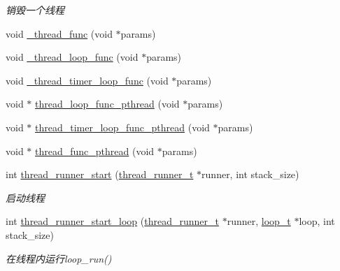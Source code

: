\begin{DoxyCompactItemize}
\begin{DoxyCompactList}\small\item\em 销毁一个线程 \end{DoxyCompactList}\item 
void \hyperlink{a00081_ae1217c770962ea59a20fa931ad6fee0c_ae1217c770962ea59a20fa931ad6fee0c}{\+\_\+thread\+\_\+func} (void $\ast$params)
\item 
void \hyperlink{a00081_ad2578ccaa4c6ce7670eabd9575204c38_ad2578ccaa4c6ce7670eabd9575204c38}{\+\_\+thread\+\_\+loop\+\_\+func} (void $\ast$params)
\item 
void \hyperlink{a00081_af3540c31c89a280433080939f96da861_af3540c31c89a280433080939f96da861}{\+\_\+thread\+\_\+timer\+\_\+loop\+\_\+func} (void $\ast$params)
\item 
void $\ast$ \hyperlink{a00081_a4f94afc82ab1358bdfdaa1739ca71655_a4f94afc82ab1358bdfdaa1739ca71655}{thread\+\_\+loop\+\_\+func\+\_\+pthread} (void $\ast$params)
\item 
void $\ast$ \hyperlink{a00081_a878593e36d665dc3334cf71e88bf93e6_a878593e36d665dc3334cf71e88bf93e6}{thread\+\_\+timer\+\_\+loop\+\_\+func\+\_\+pthread} (void $\ast$params)
\item 
void $\ast$ \hyperlink{a00081_a75b9d7e4a1d3734e2a4c0ba298b1578c_a75b9d7e4a1d3734e2a4c0ba298b1578c}{thread\+\_\+func\+\_\+pthread} (void $\ast$params)
\item 
int \hyperlink{a00107_ga1114fd962e310f9d31ed4e83d8a21897_ga1114fd962e310f9d31ed4e83d8a21897}{thread\+\_\+runner\+\_\+start} (\hyperlink{a00050_a9054159cde2f926ef61c28ce1e555199_a9054159cde2f926ef61c28ce1e555199}{thread\+\_\+runner\+\_\+t} $\ast$runner, int stack\+\_\+size)
\begin{DoxyCompactList}\small\item\em 启动线程 \end{DoxyCompactList}\item 
int \hyperlink{a00107_ga93f88ba77e7eab786da6fe7d1f681a2e_ga93f88ba77e7eab786da6fe7d1f681a2e}{thread\+\_\+runner\+\_\+start\+\_\+loop} (\hyperlink{a00050_a9054159cde2f926ef61c28ce1e555199_a9054159cde2f926ef61c28ce1e555199}{thread\+\_\+runner\+\_\+t} $\ast$runner, \hyperlink{a00050_a9c3ad1cd2de83e09f3a7b59fa82c94ee_a9c3ad1cd2de83e09f3a7b59fa82c94ee}{loop\+\_\+t} $\ast$loop, int stack\+\_\+size)
\begin{DoxyCompactList}\small\item\em 在线程内运行loop\+\_\+run() \end{DoxyCompactList}\item 

\end{DoxyCompactItemize}
